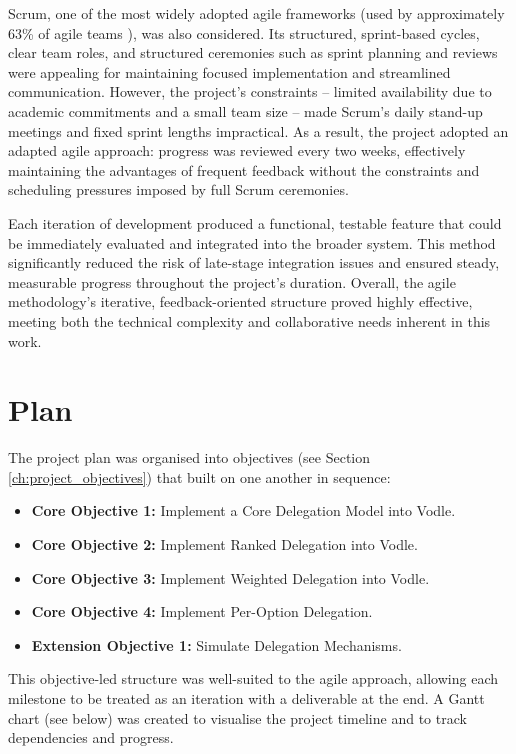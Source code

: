 Scrum, one of the most widely adopted agile frameworks (used by approximately 63\% of agile teams \citep{versionone2020stateofagile}), was also considered. Its structured, sprint-based cycles, clear team roles, and structured ceremonies such as sprint planning and reviews were appealing for maintaining focused implementation and streamlined communication. However, the project's constraints -- limited availability due to academic commitments and a small team size -- made Scrum's daily stand-up meetings and fixed sprint lengths impractical. As a result, the project adopted an adapted agile approach: progress was reviewed every two weeks, effectively maintaining the advantages of frequent feedback without the constraints and scheduling pressures imposed by full Scrum ceremonies.

Each iteration of development produced a functional, testable feature that could be immediately evaluated and integrated into the broader system. This method significantly reduced the risk of late-stage integration issues and ensured steady, measurable progress throughout the project's duration. Overall, the agile methodology's iterative, feedback-oriented structure proved highly effective, meeting both the technical complexity and collaborative needs inherent in this work.
\section{Plan}

The project plan was organised into objectives (see Section \ref{ch:project_objectives}) that built on one another in sequence:

\begin{itemize}
    \item \textbf{Core Objective 1:} Implement a Core Delegation Model into Vodle.
    \item \textbf{Core Objective 2:} Implement Ranked Delegation into Vodle.
    \item \textbf{Core Objective 3:} Implement Weighted Delegation into Vodle.
    \item \textbf{Core Objective 4:} Implement Per-Option Delegation.
    \item \textbf{Extension Objective 1:} Simulate Delegation Mechanisms.
\end{itemize}

This objective-led structure was well-suited to the agile approach, allowing each milestone to be treated as an iteration with a deliverable at the end. A Gantt chart (see below) was created to visualise the project timeline and to track dependencies and progress.

